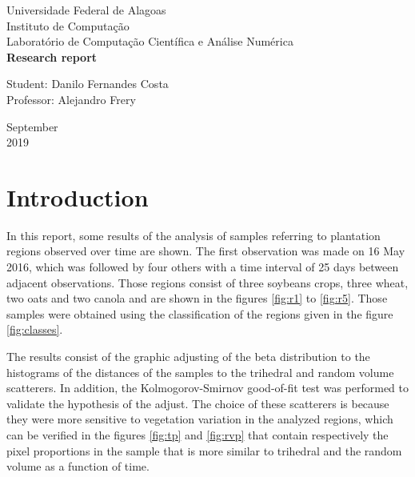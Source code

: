 \documentclass[12pt]{article}
\begin{document}

\onehalfspacing

\begin{titlepage}
\begin{center}

\Huge{Universidade Federal de Alagoas}\\
\large{Instituto de Computação}\\ 
\large{Laboratório de Computação Científica e Análise Numérica}\\ 
\vspace{220pt}
\textbf{\LARGE{Research report}}\\
\vspace{3,5cm}
\end{center}

\begin{flushleft}
\begin{tabbing}
Student: Danilo Fernandes Costa\\
Professor: Alejandro Frery\\
\end{tabbing}
\end{flushleft}
\vspace{1cm}

\begin{center}
\vspace{\fill}
September\\
2019
\end{center}
\end{titlepage}

\section{Introduction}

In this report, some results of the analysis of samples referring to plantation regions observed over time are shown. The first observation was made on 16 May 2016, which was followed by four others with a time interval of 25 days between adjacent observations. 
Those regions consist of three soybeans crops, three wheat, two oats and two canola and are shown in the figures \ref{fig:r1} to \ref{fig:r5}. Those samples were obtained using the classification of the regions given in the figure \ref{fig:classes}.

The results consist of the graphic adjusting of the beta distribution to the histograms of the distances of the samples to the trihedral and random volume scatterers. In addition, the Kolmogorov-Smirnov good-of-fit test was performed to validate the hypothesis of the adjust. The choice of these scatterers is because they were more sensitive to vegetation variation in the analyzed regions, which can be verified in the figures \ref{fig:tp} and \ref{fig:rvp} that contain respectively the pixel proportions in the sample that is more similar to trihedral and the random volume as a function of time.
\end{document}
